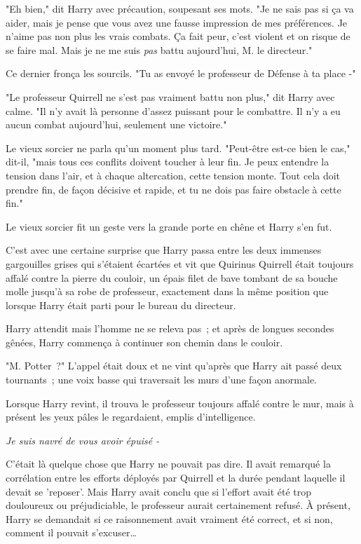 "Eh bien," dit Harry avec précaution, soupesant ses mots. "Je ne sais pas si ça va aider, mais je pense que vous avez une fausse impression de mes préférences. Je n'aime pas non plus les vrais combats. Ça fait peur, c'est violent et on risque de se faire mal. Mais je ne me suis \emph{pas} battu aujourd'hui, M. le directeur."

Ce dernier fronça les sourcils. "Tu as envoyé le professeur de Défense à ta place -"

"Le professeur Quirrell ne s'est pas vraiment battu non plus," dit Harry avec calme. "Il n'y avait là personne d'assez puissant pour le combattre. Il n'y a eu aucun combat aujourd'hui, seulement une victoire."

Le vieux sorcier ne parla qu'un moment plus tard. "Peut-être est-ce bien le cas," dit-il, "mais tous ces conflits doivent toucher à leur fin. Je peux entendre la tension dans l'air, et à chaque altercation, cette tension monte. Tout cela doit prendre fin, de façon décisive et rapide, et tu ne dois pas faire obstacle à cette fin."

Le vieux sorcier fit un geste vers la grande porte en chêne et Harry s'en fut.

\later

C'est avec une certaine surprise que Harry passa entre les deux immenses gargouilles grises qui s'étaient écartées et vit que Quirinus Quirrell était toujours affalé contre la pierre du couloir, un épais filet de bave tombant de sa bouche molle jusqu'à sa robe de professeur, exactement dans la même position que lorsque Harry était parti pour le bureau du directeur.

Harry attendit mais l'homme ne se releva pas~; et après de longues secondes gênées, Harry commença à continuer son chemin dans le couloir.

"M. Potter~?" L'appel était doux et ne vint qu'après que Harry ait passé deux tournants~; une voix basse qui traversait les murs d'une façon anormale.

Lorsque Harry revint, il trouva le professeur toujours affalé contre le mur, mais à présent les yeux pâles le regardaient, emplis d'intelligence.

\emph{Je suis navré de vous avoir épuisé -}

C'était là quelque chose que Harry ne pouvait pas dire. Il avait remarqué la corrélation entre les efforts déployés par Quirrell et la durée pendant laquelle il devait se 'reposer'. Mais Harry avait conclu que si l'effort avait été trop douloureux ou préjudiciable, le professeur aurait certainement refusé. À présent, Harry se demandait si ce raisonnement avait vraiment été correct, et si non, comment il pouvait s'excuser…

